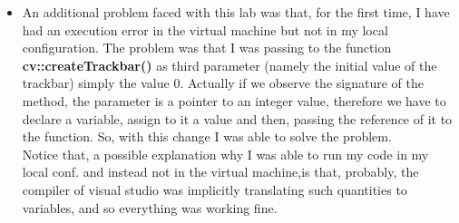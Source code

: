 \documentclass{article}
\begin{document}
\begin{flushleft}
\begin{itemize}
  \item An additional problem faced with this lab was that, for the first time, I have had an execution error in the virtual machine but not in my local configuration. The problem was that I was passing to the function \textbf{cv::createTrackbar()} as third parameter (namely the initial value of the trackbar) simply the value 0. Actually if we observe the signature of the method, the parameter is a pointer to an integer value, therefore we have to declare a variable, assign to it a value and then, passing the reference of it to the function. So, with this change I was able to solve the problem. \\
  Notice that, a possible explanation why I was able to run my code in my local conf. and instead not in the virtual machine,is that, probably, the compiler of visual studio was implicitly translating such quantities to variables, and so everything was working fine.
\end{itemize}

\newpage

\end{flushleft}
\end{document}
